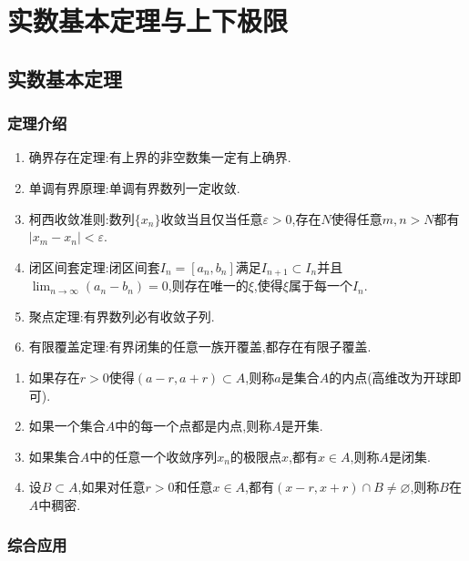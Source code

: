 \documentclass[lang=cn,newtx,10pt,scheme=chinese]{elegantbook}
\begin{document}
\chapter{实数基本定理与上下极限}

\section{实数基本定理}

\subsection{定理介绍}

\begin{theorem}[实数基本定理]\label{theorem:实数基本定理}
\begin{enumerate}
\item 确界存在定理:有上界的非空数集一定有上确界.
\item 单调有界原理:单调有界数列一定收敛.
\item 柯西收敛准则:数列\(\{x_n\}\)收敛当且仅当任意\(\varepsilon > 0\),存在\(N\)使得任意\(m,n > N\)都有\(\vert x_m - x_n\vert < \varepsilon\).
\item 闭区间套定理:闭区间套\(I_n = [a_n,b_n]\)满足\(I_{n + 1} \subset I_n\)并且\(\lim_{n \to \infty} (a_n - b_n) = 0\),则存在唯一的\(\xi\),使得\(\xi\)属于每一个\(I_n\).
\item 聚点定理:有界数列必有收敛子列.
\item 有限覆盖定理:有界闭集的任意一族开覆盖,都存在有限子覆盖.
\end{enumerate}
\end{theorem}

\begin{definition}[点集相关概念]\label{definition:点集相关概念}
\begin{enumerate}
\item 如果存在\(r > 0\)使得\((a - r,a + r) \subset A\),则称\(a\)是集合\(A\)的内点(高维改为开球即可).
\item 如果一个集合\(A\)中的每一个点都是内点,则称\(A\)是开集.
\item 如果集合\(A\)中的任意一个收敛序列\(x_n\)的极限点\(x\),都有\(x\in A\),则称\(A\)是闭集.
\item 设\(B\subset A\),如果对任意\(r > 0\)和任意\(x\in A\),都有\((x - r,x + r)\cap B\neq\varnothing\),则称\(B\)在\(A\)中稠密.
\end{enumerate}
\end{definition}

\subsection{综合应用}
\end{document}
